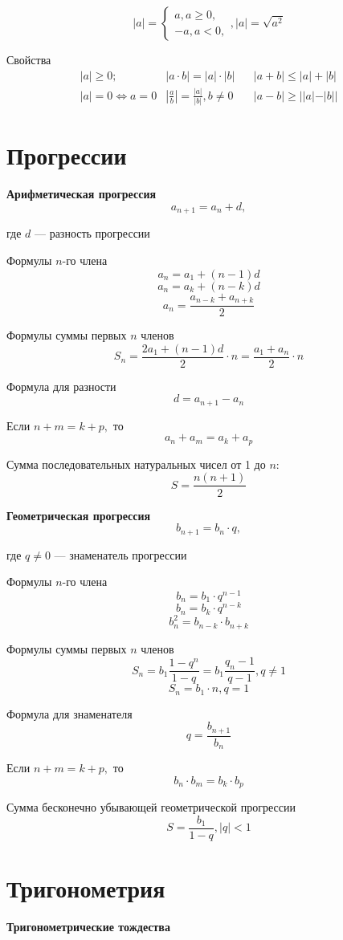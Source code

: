 \documentclass[a4paper, 12pt]{article}
\begin{document}
$$|a|=\left\{
\begin{array}{l}
a, a\ge 0,\\
-a, a<0,
\end{array}
\right., 
|a|=\sqrt{a^2}
$$

Свойства
$$ 
\begin{array}{lll}
|a|\ge 0; \ \ \ \ \ & |a\cdot b|=|a|\cdot |b| \ \ \ \ & |a+b|\le |a|+|b|\\
|a|=0 \Leftrightarrow a=0 & \left| \frac{a}{b}\right|=\frac{|a|}{|b|}, b\not=0& |a-b|\ge ||a|-|b|| 
\end{array}
$$

\section{Прогрессии}

\textbf{Арифметическая прогрессия}
$$
a_{n+1}=a_n+d,$$ 

где $d$ --- разность  прогрессии

Формулы $n$-го члена
$$a_n=a_1+(n-1)d$$
$$a_n=a_k+(n-k)d$$
$$a_n=\frac{a_{n-k}+a_{n+k}}{2}$$

Формулы суммы первых $n$ членов
$$S_n=\frac{2a_1+(n-1)d}{2}\cdot n=\frac{a_1+a_n}{2}\cdot n$$

Формула для разности
$$d=a_{n+1}-a_n$$

Если $n+m=k+p,$ то
$$a_n+a_m=a_k+a_p$$

Сумма последовательных натуральных чисел от  1 до $n:$
$$S=\frac{n(n+1)}{2}$$

\textbf{Геометрическая прогрессия}
$$
b_{n+1}=b_n\cdot q,$$ 

где $q\not= 0$ --- знаменатель  прогрессии

Формулы $n$-го члена
$$b_n=b_1\cdot q^{n-1}$$
$$b_n=b_k\cdot q^{n-k}$$
$$b_n^2=b_{n-k}\cdot b_{n+k}$$

Формулы суммы первых $n$ членов
$$S_n=b_1\frac{1-q^n}{1-q}=b_1\frac{q_n-1}{q-1}, q\not=1$$
$$S_n=b_1\cdot n, q=1$$

Формула для знаменателя
$$q=\frac{b_{n+1}}{b_n}$$

Если $n+m=k+p,$ то
$$b_n\cdot b_m=b_k\cdot b_p$$

Сумма бесконечно убывающей геометрической прогрессии
$$S=\frac{b_1}{1-q}, |q|<1$$

\section{Тригонометрия}

\textbf{Тригонометрические тождества}
\end{document}
